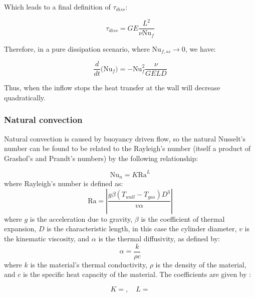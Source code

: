 \noindent Which leads to a final definition of $\tau_{diss}$:

\begin{equation}
\tau_{diss} = GE \frac{L^2}{\nu \text{Nu}_f}
\end{equation}

\noindent Therefore, in a pure dissipation scenario, where $\text{Nu}_{f,ss} \rightarrow 0$, we have:

\begin{equation}
\frac{d}{dt}\Big(\text{Nu}_f \Big) = -\text{Nu}_f^2 \frac{\nu}{GELD}
\end{equation}

\noindent Thus, when the inflow stops the heat transfer at the wall will decrease quadratically.

\subsubsection{Natural convection}
\label{sec:naturalConvection}

Natural convection is caused by buoyancy driven flow, so the natural Nusselt's number can be found to be related to the Rayleigh's number (itself a product of Grashof's and Prandt's numbers) by the following relationship:

\begin{equation}
\text{Nu}_n  = K \text{Ra}^L
\end{equation}
where Rayleigh's number is defined as:
\begin{equation}
\text{Ra} = \left| \frac{g\beta\left(T_{wall} - T_{gas} \right) D^3}{v\alpha}\right|
\end{equation}
where $g$ is the acceleration due to gravity, $\beta$ is the coefficient of thermal expansion, $D$ is the characteristic length, in this case the cylinder diameter, $v$ is the kinematic viscosity, and $\alpha$ is the thermal diffusivity, as defined by:
\begin{equation}
\label{equ:thermalDiffusivity}
\alpha = \frac{k}{\rho c}
\end{equation}
where $k$ is the material's thermal conductivity, $\rho$ is the density of the material, and $c$ is the specific heat capacity of the material. The coefficients are given by :

\begin{equation}
K =   ,  \quad L = 
\end{equation}






